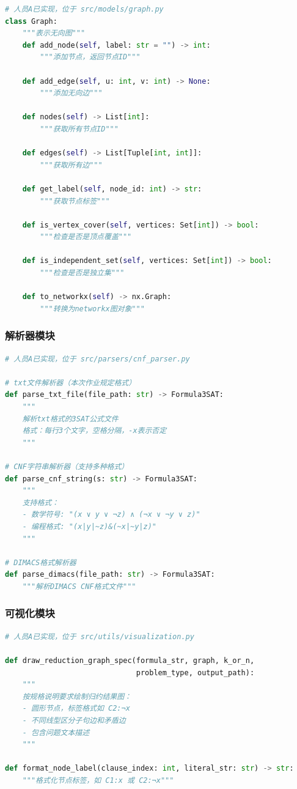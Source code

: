 \documentclass{sysucseexp}
\begin{document}
\begin{lstlisting}[language=Python]
# 人员A已实现，位于 src/models/graph.py
class Graph:
    """表示无向图"""
    def add_node(self, label: str = "") -> int:
        """添加节点，返回节点ID"""
        
    def add_edge(self, u: int, v: int) -> None:
        """添加无向边"""
        
    def nodes(self) -> List[int]:
        """获取所有节点ID"""
        
    def edges(self) -> List[Tuple[int, int]]:
        """获取所有边"""
        
    def get_label(self, node_id: int) -> str:
        """获取节点标签"""
        
    def is_vertex_cover(self, vertices: Set[int]) -> bool:
        """检查是否是顶点覆盖"""
        
    def is_independent_set(self, vertices: Set[int]) -> bool:
        """检查是否是独立集"""
        
    def to_networkx(self) -> nx.Graph:
        """转换为networkx图对象"""
\end{lstlisting}

\subsubsection{解析器模块}

\begin{lstlisting}[language=Python]
# 人员A已实现，位于 src/parsers/cnf_parser.py

# txt文件解析器（本次作业规定格式）
def parse_txt_file(file_path: str) -> Formula3SAT:
    """
    解析txt格式的3SAT公式文件
    格式：每行3个文字，空格分隔，-x表示否定
    """
    
# CNF字符串解析器（支持多种格式）
def parse_cnf_string(s: str) -> Formula3SAT:
    """
    支持格式：
    - 数学符号: "(x ∨ y ∨ ¬z) ∧ (¬x ∨ ¬y ∨ z)"
    - 编程格式: "(x|y|~z)&(~x|~y|z)"
    """
    
# DIMACS格式解析器
def parse_dimacs(file_path: str) -> Formula3SAT:
    """解析DIMACS CNF格式文件"""
\end{lstlisting}

\subsubsection{可视化模块}

\begin{lstlisting}[language=Python]
# 人员A已实现，位于 src/utils/visualization.py

def draw_reduction_graph_spec(formula_str, graph, k_or_n,
                              problem_type, output_path):
    """
    按规格说明要求绘制归约结果图：
    - 圆形节点，标签格式如 C2:¬x
    - 不同线型区分子句边和矛盾边
    - 包含问题文本描述
    """

def format_node_label(clause_index: int, literal_str: str) -> str:
    """格式化节点标签，如 C1:x 或 C2:¬x"""
\end{lstlisting}
\end{document}
